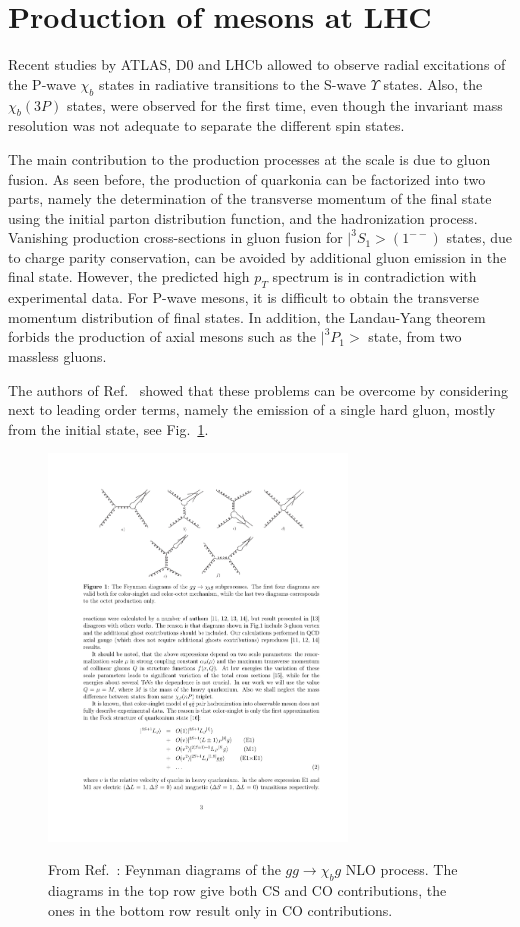 \section{Production of \chib mesons at LHC}

Recent studies by ATLAS, D0 and LHCb \cite{chibATL,chibD0,chibLHCb} allowed to
observe radial excitations of the P-wave $\chi_b$ states in radiative
transitions to the S-wave $\Upsilon$ states. Also, the $\chi_b(3P)$ states,
were observed for the first time, even though the invariant mass resolution was
not adequate to separate the different spin states.

The main contribution to the production processes at the \tev scale is due to
gluon fusion. As seen before, the production of quarkonia can be factorized
into two parts, namely the determination of the transverse momentum of the
final state using the initial parton distribution function, and the
hadronization process. Vanishing production cross-sections in gluon fusion for
$|^3 S_1> (1^{--})$ states, due to charge parity conservation, can be avoided
by additional gluon emission in the final state. However, the predicted high
$p_T$ spectrum is in contradiction with experimental data. For P-wave mesons,
it is difficult to obtain the transverse momentum distribution of final states.
In addition, the Landau-Yang theorem forbids the production of axial mesons
such as the $|^3P_1>$ state, from two massless gluons.

The authors of Ref.~\cite{chibprod} showed that these problems can be overcome
by considering next to leading order terms, namely the emission of a single
hard gluon, mostly from the initial state, see Fig.~\ref{chibprod_fig1}.

\begin{figure}
\center
\includegraphics[width=300px]{figs/review/chibprod_fig1.pdf}
\label{chibprod_fig1} 
\caption{From Ref.~\cite{chibprod}: Feynman diagrams of the $gg\rightarrow \chi_b g$ NLO 
process. The diagrams in the top row give both CS and CO contributions, the ones in the 
bottom row result only in CO contributions.}
\end{figure} 

